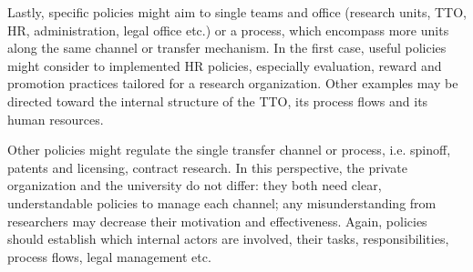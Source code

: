 Lastly, specific policies might aim to single teams and office (research units, TTO, HR, administration, legal office etc.) or a process, which encompass more units along the same channel or transfer mechanism. In the first case, useful policies might consider to implemented HR policies, especially evaluation, reward and promotion practices tailored for a research organization. Other examples may be directed toward the internal structure of the TTO, its process flows and its human resources.

Other policies might regulate the single transfer channel or process, i.e. spinoff, patents and licensing, contract research. In this perspective, the private organization and the university do not differ: they both need clear, understandable policies to manage each channel; any misunderstanding from researchers may decrease their motivation and effectiveness. Again, policies should establish which internal actors are involved, their tasks, responsibilities, process flows, legal management etc.
